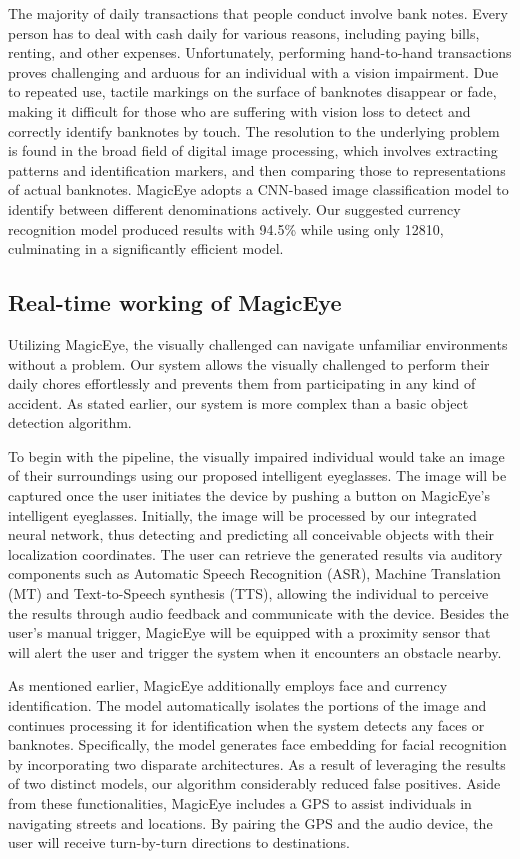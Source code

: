 \documentclass[journal,12pt,onecolumn,letterpaper]{IEEEtran}
\begin{document}
The majority of daily transactions that people conduct involve bank notes. Every person has to deal with cash daily for various reasons, including paying bills, renting, and other expenses. Unfortunately, performing hand-to-hand transactions proves challenging and arduous for an individual with a vision impairment. Due to repeated use, tactile markings on the surface of banknotes disappear or fade, making it difficult for those who are suffering with vision loss to detect and correctly identify banknotes by touch. The resolution to the underlying problem is found in the broad field of digital image processing, which involves extracting patterns and identification markers, and then comparing those to representations of actual banknotes. MagicEye adopts a CNN-based image classification model to identify between different denominations actively. Our suggested currency recognition model produced results with 94.5\% while using only 12810, culminating in a significantly efficient model. 

\subsection{Real-time working of MagicEye}

Utilizing MagicEye, the visually challenged can navigate unfamiliar environments without a problem. Our system allows the visually challenged to perform their daily chores effortlessly and prevents them from participating in any kind of accident. As stated earlier, our system is more complex than a basic object detection algorithm. 

To begin with the pipeline, the visually impaired individual would take an image of their surroundings using our proposed intelligent eyeglasses. The image will be captured once the user initiates the device by pushing a button on MagicEye's intelligent eyeglasses. Initially, the image will be processed by our integrated neural network, thus detecting and predicting all conceivable objects with their localization coordinates. The user can retrieve the generated results via auditory components such as Automatic Speech Recognition (ASR), Machine Translation (MT) and Text-to-Speech synthesis (TTS), allowing the individual to perceive the results through audio feedback and communicate with the device. Besides the user's manual trigger, MagicEye will be equipped with a proximity sensor that will alert the user and trigger the system when it encounters an obstacle nearby. 

As mentioned earlier, MagicEye additionally employs face and currency identification. The model automatically isolates the portions of the image and continues processing it for identification when the system detects any faces or banknotes. Specifically, the model generates face embedding for facial recognition by incorporating two disparate architectures. As a result of leveraging the results of two distinct models, our algorithm considerably reduced false positives. Aside from these functionalities, MagicEye includes a GPS to assist individuals in navigating streets and locations. By pairing the GPS and the audio device, the user will receive turn-by-turn directions to destinations.
\end{document}
